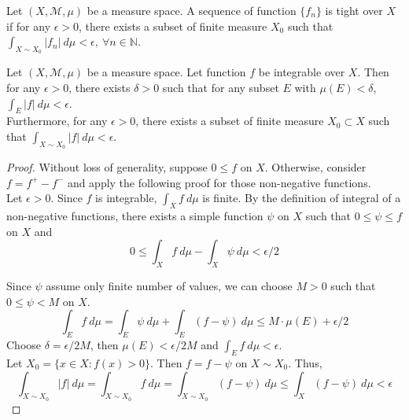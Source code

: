 \begin{definition}
	Let $(X,\mathcal{M},\mu)$ be a measure space.
	A sequence of function $\{ f_n \}$ is tight over $X$ if for any $\epsilon > 0$, there exists a subset of finite measure $X_0$ such that $\displaystyle \int_{X \sim X_0} | f_n | \ d\mu < \epsilon,\ \forall n \in \mathbb{N}$.
\end{definition}

\begin{theorem}
	Let $(X,\mathcal{M},\mu)$ be a measure space.
	Let function $f$ be integrable over $X$.
	Then for any $\epsilon > 0$, there exists $\delta > 0$ such that for any subset $E$ with $\mu(E) < \delta$, $\displaystyle \int_E |f| \ d\mu < \epsilon$.\\

	Furthermore, for any $\epsilon > 0$, there exists a subset of finite measure $X_0 \subset X$ such that $\displaystyle \int_{X \sim X_0} |f| \ d\mu < \epsilon$.
\end{theorem}
\begin{proof}
	Without loss of generality, suppose $0 \le f$ on $X$.
	Otherwise, consider $f = f^+ - f^-$ and apply the following proof for those non-negative functions.\\

	Let $\epsilon > 0$.
	Since $f$ is integrable, $\int_X f \ d\mu $ is finite.
	By the definition of integral of a non-negative functions, there exists a simple function $\psi$ on $X$ such that $0 \le \psi \le f$ on $X$ and
	$$0 \le \int_X f \ d\mu - \int_X \psi \ d\mu < \epsilon/2$$

	Since $\psi$ assume only finite number of values, we can choose $M > 0$ such that $0 \le \psi < M$ on $X$.
	$$ \int_E f \ d\mu = \int_E \psi \ d\mu + \int_E (f - \psi) \ d\mu \le M \cdot \mu(E) + \epsilon/2 $$
	Choose $\delta = \epsilon/2M$, then $\mu(E) < \epsilon/2M$ and $\int_E f \ d\mu < \epsilon$.\\

	Let $X_0 = \{ x \in X : f(x) > 0 \}$.
	Then $f = f-\psi$ on $X \sim X_0$.
	Thus,
	$$ \int_{X \sim X_0} |f| \ d\mu = \int_{X \sim X_0} f \ d\mu = \int_{X \sim X_0} (f-\psi) \ d\mu \le \int_X (f-\psi) \ d\mu < \epsilon $$
\end{proof}

